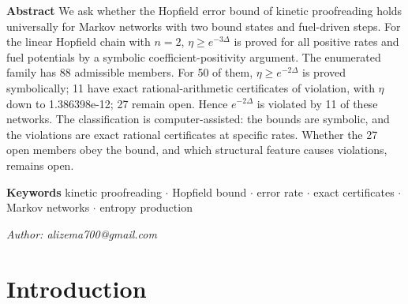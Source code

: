 \documentclass[10pt,twocolumn]{article}
\theoremstyle{definition}\newtheorem{definition}{Definition}\newtheorem{example}{Example}
\begin{document}
\thispagestyle{plain}
\noindent\textbf{Abstract} We ask whether the Hopfield error bound of kinetic proofreading holds universally for Markov networks with two bound states and fuel-driven steps. For the linear Hopfield chain with \(n=2\), \(\eta \geq e^{-3\Delta}\) is proved for all positive rates and fuel potentials by a symbolic coefficient-positivity argument. The enumerated family has 88 admissible members. For 50 of them, \(\eta \geq e^{-2\Delta}\) is proved symbolically; 11 have exact rational-arithmetic certificates of violation, with \(\eta\) down to 1.386398e-12; 27 remain open. Hence \(e^{-2\Delta}\) is violated by 11 of these networks. The classification is computer-assisted: the bounds are symbolic, and the violations are exact rational certificates at specific rates. Whether the 27 open members obey the bound, and which structural feature causes violations, remains open.
\par\medskip
\noindent\textbf{Keywords} kinetic proofreading $\cdot$ Hopfield bound $\cdot$ error rate $\cdot$ exact certificates $\cdot$ Markov networks $\cdot$ entropy production\par\medskip
\emph{Author: alizema700@gmail.com}

\section{Introduction}\label{introduction}
\end{document}
